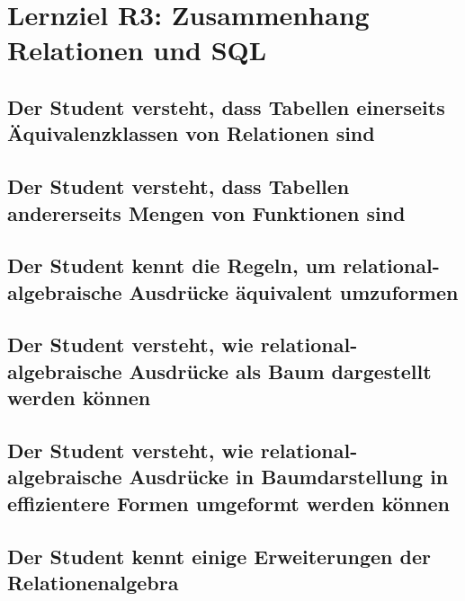 \section{Lernziel R3: Zusammenhang Relationen und SQL}

\subsection{Der Student versteht, dass Tabellen einerseits Äquivalenzklassen von Relationen sind}

\subsection{Der Student versteht, dass Tabellen andererseits Mengen von Funktionen sind}

\subsection{Der Student kennt die Regeln, um relational-algebraische Ausdrücke äquivalent umzuformen}

\subsection{Der Student versteht, wie relational-algebraische Ausdrücke als Baum dargestellt werden können}
\label{sec:anfragebaum}

\subsection{Der Student versteht, wie relational-algebraische Ausdrücke in Baumdarstellung in effizientere Formen umgeformt werden können}

\subsection{Der Student kennt einige Erweiterungen der Relationenalgebra}